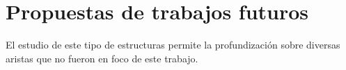 

\section{Propuestas de trabajos futuros}

El estudio de este tipo de estructuras permite la profundización sobre diversas aristas que no fueron en foco de este trabajo.

